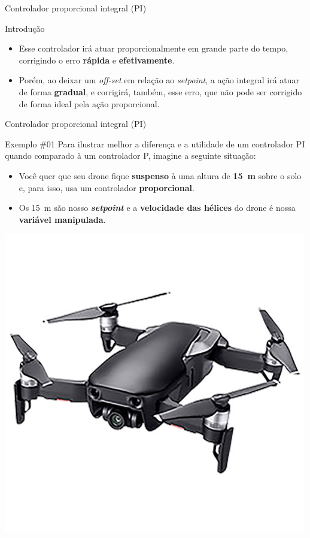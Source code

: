 \begin{frame}{Controlador proporcional integral (PI)}
	\begin{block}{Introdução}
		\begin{itemize}
			\item Esse controlador irá atuar proporcionalmente em grande parte do tempo, corrigindo o erro \textbf{rápida} e \textbf{efetivamente}.
			\item Porém, ao deixar um \textit{off-set} em relação ao \textit{setpoint}, a ação integral irá atuar de forma \textbf{gradual}, e corrigirá, também, esse erro, que não pode ser corrigido de forma ideal pela ação proporcional.
		\end{itemize}
	\end{block}
\end{frame}


\begin{frame}{Controlador proporcional integral (PI)}
	\begin{block}{Exemplo \#01}
		Para ilustrar melhor a diferença e a utilidade de um controlador PI quando comparado à um controlador P, imagine a seguinte situação:
		\begin{itemize}
			\item Você quer que seu drone fique \textbf{suspenso} à uma altura de \textbf{\SI{15}{\meter}} sobre o solo e, para isso, usa um controlador \textbf{proporcional}.
			\item Os \SI{15}{\meter} são nosso \textbf{\textit{setpoint}} e a \textbf{velocidade das hélices} do drone é nossa \textbf{variável manipulada}.
		\end{itemize}
	\end{block}

	\centering
	\includegraphics[width=0.4\linewidth]{Figuras/Ch12/fig4n3}
\end{frame}


